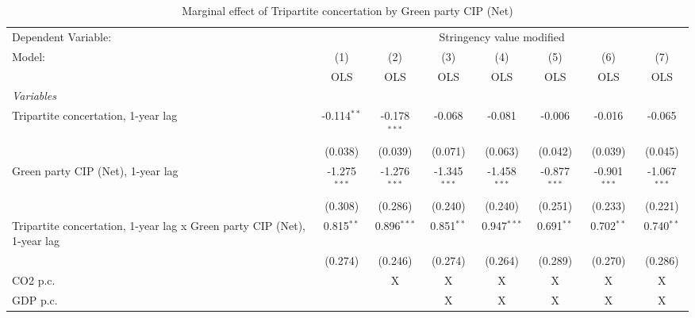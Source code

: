 
\begin{table}[htbp]
   \caption{Marginal effect of Tripartite concertation by Green party CIP (Net)}
   \centering
   \begin{tabular}{lccccccc}
      \toprule
      Dependent Variable: & \multicolumn{7}{c}{Stringency value modified}\\
      Model:                                                                  & (1)            & (2)            & (3)            & (4)            & (5)            & (6)            & (7)\\  
                                                                              &  OLS           & OLS            & OLS            & OLS            & OLS            & OLS            & OLS\\  
      \midrule
      \emph{Variables}\\
      Tripartite concertation, 1-year lag                                     & -0.114$^{**}$  & -0.178$^{***}$ & -0.068         & -0.081         & -0.006         & -0.016         & -0.065\\   
                                                                              & (0.038)        & (0.039)        & (0.071)        & (0.063)        & (0.042)        & (0.039)        & (0.045)\\   
      Green party CIP (Net), 1-year lag                                       & -1.275$^{***}$ & -1.276$^{***}$ & -1.345$^{***}$ & -1.458$^{***}$ & -0.877$^{***}$ & -0.901$^{***}$ & -1.067$^{***}$\\   
                                                                              & (0.308)        & (0.286)        & (0.240)        & (0.240)        & (0.251)        & (0.233)        & (0.221)\\   
      Tripartite concertation, 1-year lag x Green party CIP (Net), 1-year lag & 0.815$^{**}$   & 0.896$^{***}$  & 0.851$^{**}$   & 0.947$^{***}$  & 0.691$^{**}$   & 0.702$^{**}$   & 0.740$^{**}$\\   
                                                                              & (0.274)        & (0.246)        & (0.274)        & (0.264)        & (0.289)        & (0.270)        & (0.286)\\   
      CO2 p.c.                                                                &                & X              & X              & X              & X              & X              & X\\  
      GDP p.c.                                                                &                &                & X              & X              & X              & X              & X\\  

\end{tabular}
\end{table}
